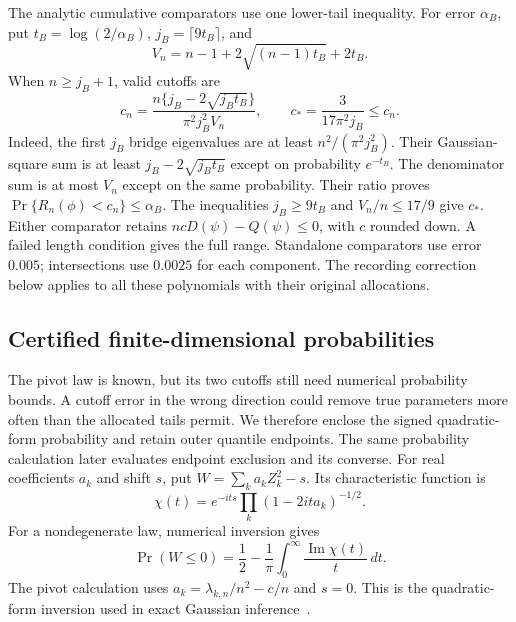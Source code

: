 The analytic cumulative comparators use one lower-tail inequality. For error $\alpha_B$, put $t_B=\log(2/\alpha_B)$, $j_B=\lceil9t_B\rceil$, and
\[
 V_n=n-1+2\sqrt{(n-1)t_B}+2t_B.
\]
When $n\ge j_B+1$, valid cutoffs are
\begin{equation}\label{src16:si-analytic-cutoffs}
 c_n=\frac{n\{j_B-2\sqrt{j_Bt_B}\}}{\pi^2j_B^2V_n},
 \qquad c_* =\frac{3}{17\pi^2j_B}\le c_n.
\end{equation}
Indeed, the first $j_B$ bridge eigenvalues are at least $n^2/(\pi^2j_B^2)$. Their Gaussian-square sum is at least $j_B-2\sqrt{j_Bt_B}$ except on probability $e^{-t_B}$. The denominator sum is at most $V_n$ except on the same probability. Their ratio proves $\Pr\{R_n(\phi)<c_n\}\le\alpha_B$. The inequalities $j_B\ge9t_B$ and $V_n/n\le17/9$ give $c_*$. Either comparator retains $ncD(\psi)-Q(\psi)\le0$, with $c$ rounded down. A failed length condition gives the full range. Standalone comparators use error $0.005$; intersections use $0.0025$ for each component. The recording correction below applies to all these polynomials with their original allocations.

\subsection{Certified finite-dimensional probabilities}\label{src16:si-cdf}
The pivot law is known, but its two cutoffs still need numerical probability bounds. A cutoff error in the wrong direction could remove true parameters more often than the allocated tails permit. We therefore enclose the signed quadratic-form probability and retain outer quantile endpoints. The same probability calculation later evaluates endpoint exclusion and its converse.
For real coefficients $a_k$ and shift $s$, put $W=\sum_k a_kZ_k^2-s$. Its characteristic function is
\begin{equation}\label{src16:si-cf}
 \chi(t)=e^{-its}\prod_k(1-2it a_k)^{-1/2}.
\end{equation}
For a nondegenerate law, numerical inversion gives
\begin{equation}\label{src16:si-inversion}
 \Pr(W\le0)=\frac12-\frac1\pi\int_0^\infty
                    \frac{\operatorname{Im}\chi(t)}{t}\,dt.
\end{equation}
The pivot calculation uses $a_k=\lambda_{k,n}/n^2-c/n$ and $s=0$. This is the quadratic-form inversion used in exact Gaussian inference~\cite{imhof1961,davies1980,dufourking1991}.

